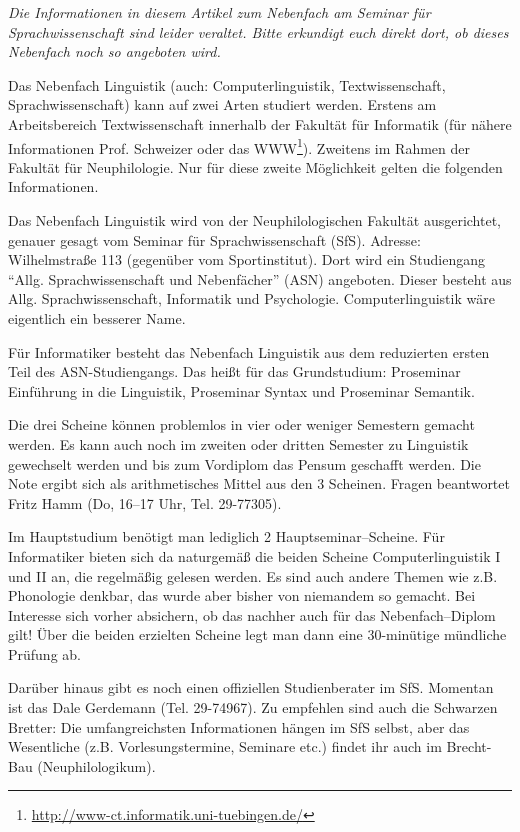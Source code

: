 
\textit{Die Informationen in diesem Artikel zum Nebenfach am Seminar für Sprachwissenschaft sind leider veraltet. Bitte erkundigt euch direkt dort, ob dieses Nebenfach noch so angeboten wird.}

Das Nebenfach Linguistik (auch: Computerlinguistik, Textwissenschaft,
  Sprachwissenschaft) kann auf zwei Arten studiert werden.  Erstens am
  Arbeitsbereich Textwissenschaft innerhalb der Fakultät für
  Informatik (für nähere Informationen Prof. Schweizer oder das
  WWW\footnote{\url{http://www-ct.informatik.uni-tuebingen.de/}}).  Zweitens im
  Rahmen der Fakultät für Neuphilologie.  Nur für diese zweite
  Möglichkeit gelten die folgenden Informationen.\bigskip

Das Nebenfach Linguistik wird von der Neuphilologischen Fakultät
  ausgerichtet, genauer gesagt vom Seminar für Sprachwissenschaft (SfS).
  Adresse: Wilhelmstraße 113 (gegenüber vom Sportinstitut).
Dort wird ein Studiengang "`Allg. Sprachwissenschaft und Nebenfächer"'
  (ASN) angeboten.
Dieser besteht aus Allg. Sprachwissenschaft, Informatik und
  Psychologie.
Computerlinguistik wäre eigentlich ein besserer Name.

Für Informatiker besteht das Nebenfach Linguistik aus dem
  reduzierten ersten Teil des ASN-Studiengangs.
Das heißt für das Grundstudium:
  Proseminar Einführung in die Linguistik, Proseminar Syntax und
  Proseminar Semantik.

Die drei Scheine können problemlos in vier oder weniger Semestern
  gemacht werden.  Es kann auch noch im zweiten oder dritten Semester zu
  Linguistik gewechselt werden und bis zum Vordiplom das Pensum
  geschafft werden.
  Die Note ergibt sich als arithmetisches Mittel aus den 3 Scheinen.
  Fragen beantwortet Fritz Hamm (Do, 16--17 Uhr, Tel. 29-77305).\bigskip

Im Hauptstudium benötigt man lediglich 2 Hauptseminar--Scheine. Für
  Informatiker bieten sich da naturgemäß die beiden Scheine
  Computerlinguistik I und II an, die regelmäßig gelesen werden.  Es sind
  auch andere Themen wie z.B. Phonologie denkbar, das wurde aber bisher von
  niemandem so gemacht.  Bei Interesse sich vorher absichern, ob das nachher
  auch für das Nebenfach--Diplom gilt! Über die beiden erzielten Scheine
  legt man dann eine 30-minütige mündliche Prüfung ab.

Darüber hinaus gibt es noch einen offiziellen Studienberater im SfS.
  Momentan ist das Dale Gerdemann (Tel. 29-74967).
  Zu empfehlen sind auch die Schwarzen Bretter:
  Die umfangreichsten Informationen hängen im SfS selbst, aber das
  Wesentliche (z.B. Vorlesungstermine, Seminare etc.) findet ihr auch im Brecht-Bau (Neuphilologikum).




